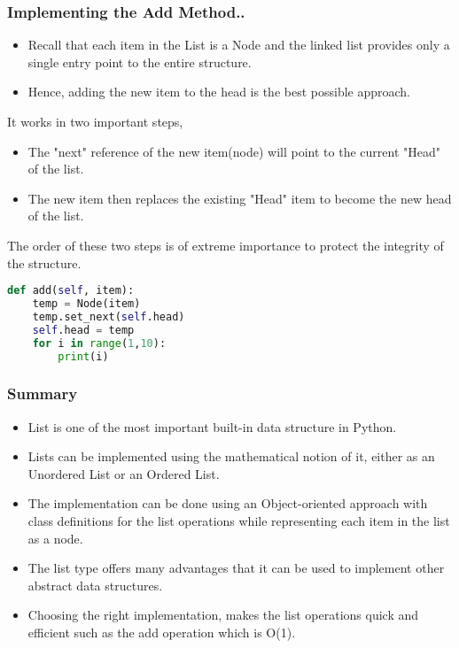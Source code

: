 \documentclass{beamer}
\begin{document}
\begin{frame}
\frametitle{Implementing the Add Method..}
\begin{itemize}
\item Recall that each item in the List is a Node and the linked list provides only a single entry point to the entire structure.

\item Hence, adding the new item to the head is the best possible approach.

\end{itemize}
It works in two important steps,
\begin{itemize}

\item The "next" reference of the new item(node) will point to the current "Head" of the list.

\item The new item then replaces the existing "Head" item to become the new head of the list.

\end{itemize}

The order of these two steps is of extreme importance to protect the integrity of the structure. 
 
\end{frame}

\begin{frame}[fragile]

\begin{lstlisting}[language=Python, keywordstyle=\color{blue}]
def add(self, item):
	temp = Node(item)
	temp.set_next(self.head)
	self.head = temp
	for i in range(1,10):
		print(i)
\end{lstlisting}
\end{frame}

\begin{frame}
\frametitle{Summary}
\begin{itemize}
\item List is one of the most important built-in data structure in Python.
\item Lists can be implemented using the mathematical notion of it, either as an Unordered List or an Ordered List.
\item The implementation can be done using an Object-oriented approach with class definitions for the list operations while representing each item in the list as a node.
\item The list type offers many advantages that it can be used to implement other abstract data structures.
\item Choosing the right implementation, makes the list operations quick and efficient such as the add operation which is O(1).
\end{itemize}
\end{frame}
\end{document}
